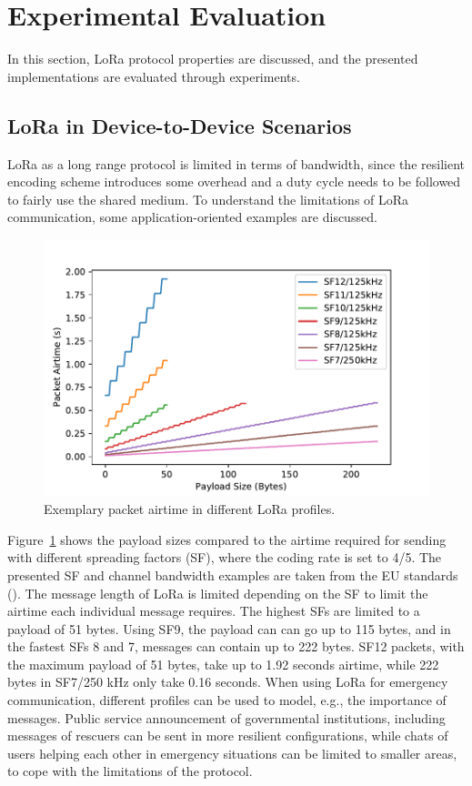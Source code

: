 \section{Experimental Evaluation}
\label{sec:eval}

In this section, LoRa protocol properties are discussed, and the presented implementations are evaluated through experiments.

\subsection{LoRa in Device-to-Device Scenarios}
LoRa as a long range protocol is limited in terms of bandwidth, since the resilient encoding scheme introduces some overhead and a duty cycle needs to be followed to fairly use the shared medium.
To understand the limitations of LoRa communication, some application-oriented examples are discussed.

\begin{figure}[ht!]
    \centering
    \includegraphics[width=.8\columnwidth]{gfx/lora-airtime.pdf}
    \caption{Exemplary packet airtime in different LoRa profiles.}
    \label{fig:lora-airtime}
\end{figure}

Figure~\ref{fig:lora-airtime} shows the payload sizes compared to the airtime required for sending with different spreading factors (SF), where the coding rate is set to 4/5.
The presented SF and channel bandwidth examples are taken from the EU standards (\cite{alliance2016lorawan}).
The message length of LoRa is limited depending on the SF to limit the airtime each individual message requires. 
The highest SFs are limited to a payload of 51 bytes. Using SF9, the payload can can go up to 115 bytes, and in the fastest SFs 8 and 7, messages can contain up to 222 bytes. 
SF12 packets, with the maximum payload of 51 bytes, take up to 1.92 seconds airtime, while 222 bytes in SF7/250 kHz only take 0.16 seconds.
When using LoRa for emergency communication, different profiles can be used to model, e.g., the importance of messages. 
Public service announcement of governmental institutions, including messages of rescuers can be sent in more resilient configurations, while chats of users helping each other in emergency situations can be limited to smaller areas, to cope with the limitations of the protocol.



